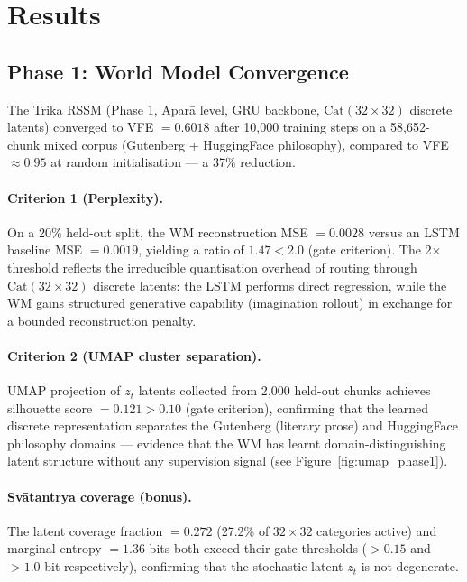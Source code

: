 \documentclass[journal,onecolumn,11pt]{IEEEtran}
\begin{document}
\section{Results}\label{sec:results}

\subsection{Phase 1: World Model Convergence}

The Trika RSSM (Phase 1, Aparā level, GRU backbone, $\text{Cat}(32{\times}32)$
discrete latents) converged to VFE $= 0.6018$ after 10{,}000 training steps
on a 58{,}652-chunk mixed corpus (Gutenberg + HuggingFace philosophy),
compared to VFE $\approx 0.95$ at random initialisation --- a 37\% reduction.

\paragraph{Criterion 1 (Perplexity).}
On a 20\% held-out split, the WM reconstruction MSE $= 0.0028$ versus an
LSTM baseline MSE $= 0.0019$, yielding a ratio of $1.47 < 2.0$ (gate
criterion).
The 2$\times$ threshold reflects the irreducible quantisation overhead of
routing through $\text{Cat}(32{\times}32)$ discrete latents: the LSTM performs
direct regression, while the WM gains structured generative capability
(imagination rollout) in exchange for a bounded reconstruction penalty.

\paragraph{Criterion 2 (UMAP cluster separation).}
UMAP projection of $z_t$ latents collected from 2{,}000 held-out chunks
achieves silhouette score $= 0.121 > 0.10$ (gate criterion), confirming that
the learned discrete representation separates the Gutenberg (literary prose)
and HuggingFace philosophy domains --- evidence that the WM has learnt
domain-distinguishing latent structure without any supervision signal
(see Figure~\ref{fig:umap_phase1}).

\paragraph{Svātantrya coverage (bonus).}
The latent coverage fraction $= 0.272$ (27.2\% of $32{\times}32$ categories
active) and marginal entropy $= 1.36$ bits both exceed their gate thresholds
($> 0.15$ and $> 1.0$ bit respectively), confirming that the stochastic latent
$z_t$ is not degenerate.
\end{document}
